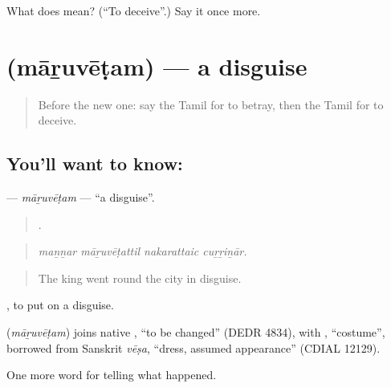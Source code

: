 \begin{tcolorbox}[breakable,colback=teal!4,colframe=teal!35!black,title={Before you move on}]
What does  mean? (\textquotedblleft{}To deceive\textquotedblright{}.) Say it once more.
\end{tcolorbox}
\section[\texorpdfstring{\ta{மாறுவேடம்} (māṟuvēṭam)}{மாறுவேடம் (māṟuvēṭam)}]{ (māṟuvēṭam) — a disguise}

\label{lesson:TA-C337-maruvetam}



\begin{quote}
Before the new one: say the Tamil for to betray, then the Tamil for to deceive.
\end{quote}

\subsection*{You'll want to know: }
\textbf{} — \emph{māṟuvēṭam} — \textquotedblleft{}a disguise\textquotedblright{}.

\begin{quote}
   .
\end{quote}

\begin{quote}
\emph{maṉṉar māṟuvēṭattil nakarattaic cuṟṟiṉār.}
\end{quote}

\begin{quote}
The king went round the city in disguise.
\end{quote}

 , to put on a disguise.

\begin{cousinweb}
\textbf{} (\emph{māṟuvēṭam}) joins native , \textquotedblleft{}to be changed\textquotedblright{} (DEDR 4834), with , \textquotedblleft{}costume\textquotedblright{}, borrowed from Sanskrit \emph{vēṣa}, \textquotedblleft{}dress, assumed appearance\textquotedblright{} (CDIAL 12129).
\end{cousinweb}

\begin{grammarlens}[title={What you've built}]
One more word for telling what happened.
\end{grammarlens}

